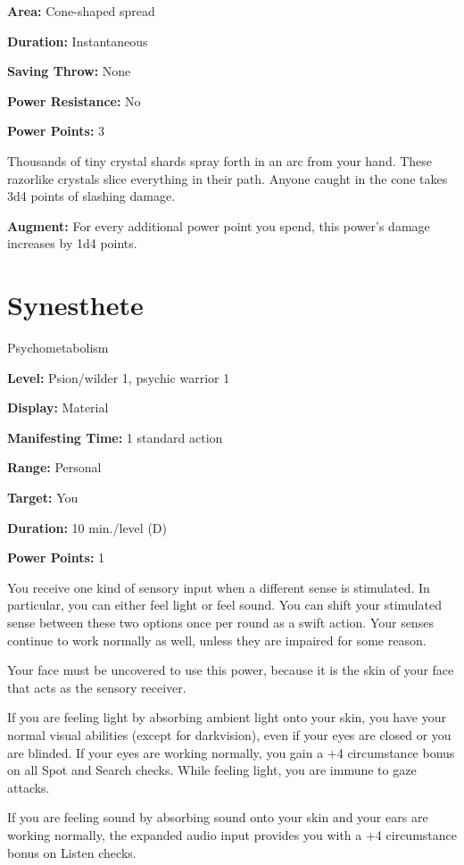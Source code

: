 \documentclass{article}
\begin{document}
\textbf{Area:} Cone-shaped spread

\textbf{Duration:} Instantaneous

\textbf{Saving Throw:} None

\textbf{Power Resistance:} No

\textbf{Power Points:} 3

Thousands of tiny crystal shards spray forth in an arc from your hand. These razorlike 
crystals slice everything in their path. Anyone caught in the cone takes 3d4 points 
of slashing damage.

\textbf{Augment:} For every additional power point you spend, this power's damage 
increases by 1d4 points.

\vspace{12pt}
\section*{Synesthete}

Psychometabolism

\textbf{Level:} Psion/wilder 1, psychic warrior 1

\textbf{Display: }Material

\textbf{Manifesting Time:} 1 standard action

\textbf{Range:} Personal

\textbf{Target:} You

\textbf{Duration:} 10 min./level (D)

\textbf{Power Points:} 1

You receive one kind of sensory input when a different sense is stimulated. In 
particular, you can either feel light or feel sound. You can shift your stimulated 
sense between these two options once per round as a swift action. Your senses continue 
to work normally as well, unless they are impaired for some reason.

Your face must be uncovered to use this power, because it is the skin of your face 
that acts as the sensory receiver.

If you are feeling light by absorbing ambient light onto your skin, you have your 
normal visual abilities (except for darkvision), even if your eyes are closed or 
you are blinded. If your eyes are working normally, you gain a +4 circumstance 
bonus on all Spot and Search checks. While feeling light, you are immune to gaze 
attacks.

If you are feeling sound by absorbing sound onto your skin and your ears are working 
normally, the expanded audio input provides you with a +4 circumstance bonus on 
Listen checks.
\end{document}
